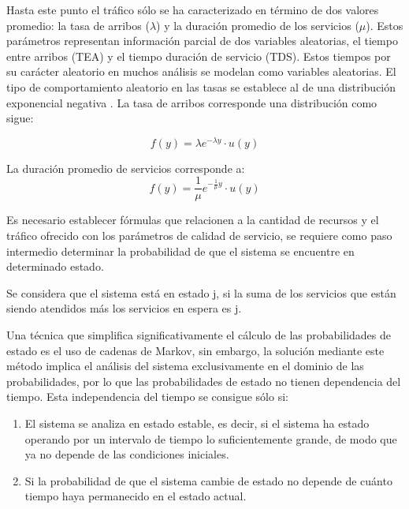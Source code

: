 Hasta este punto el tráfico sólo se ha caracterizado en término de dos valores promedio: la tasa de arribos ($\lambda$) y la duración promedio de los servicios ($\mu$). Estos parámetros representan información parcial de dos variables aleatorias, el tiempo entre arribos (TEA) y el tiempo duración de servicio (TDS). Estos tiempos por su carácter aleatorio en muchos análisis se modelan como variables aleatorias. El tipo de comportamiento aleatorio en las tasas se establece al de una distribución exponencial negativa \parencite{Carter1990}. La tasa de arribos corresponde una distribución como sigue:

\begin{equation}
f(y)=\lambda e^{-\lambda y}\cdot u(y)
\label{eqn:lambda}
\end{equation}

La duración promedio de servicios corresponde a:
\begin{equation}
f(y)=\frac{1}{\mu } e^{-\frac{1}{\mu} y} \cdot u(y)
\label{eqn:mu}
\end{equation} 

Es necesario establecer fórmulas que relacionen a la cantidad de recursos y el tráfico ofrecido con los parámetros de calidad de servicio, se requiere como paso intermedio determinar la probabilidad de que el sistema se encuentre en determinado estado.\newline

Se considera que el sistema está en estado j, si la suma de los servicios que están siendo atendidos más los servicios en espera es j.\newline

Una técnica que simplifica significativamente el cálculo de las probabilidades de estado es el uso de cadenas de Markov, sin embargo, la solución mediante este método implica el análisis del sistema exclusivamente en el dominio de las probabilidades, por lo que las probabilidades de estado no tienen dependencia del tiempo. Esta independencia del tiempo se consigue sólo si:

\begin{enumerate}
\item  El sistema se analiza en estado estable, es decir, si el sistema ha estado operando por un intervalo de tiempo lo suficientemente grande, de modo que ya no depende de las condiciones iniciales.
\item  Si la probabilidad de que el sistema cambie de estado no depende de cuánto tiempo haya permanecido en el estado actual.
\end{enumerate}

